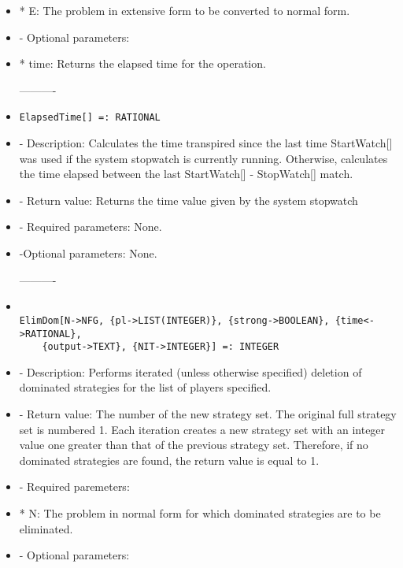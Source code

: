 \begin{itemize}
\bd
\item
*  E:  The problem in extensive form to be converted to normal form.
\ed

\item
- Optional parameters:
	
\bd
\item
*  time:  Returns the elapsed time for the operation.
\ed
\ed

----------

\item
\begin{verbatim}
ElapsedTime[] =: RATIONAL
\end{verbatim}

\bd
\item
- Description:  Calculates the time transpired since the last time
StartWatch[] was used if the system stopwatch is currently running.
Otherwise, calculates the time elapsed between the last StartWatch[] -
StopWatch[] match.
\item
- Return value:  Returns the time value given by the system stopwatch
\item
- Required parameters:  None.
\item   
-Optional parameters:  None.
\ed

----------
\item
\begin{verbatim}

ElimDom[N->NFG, {pl->LIST(INTEGER)}, {strong->BOOLEAN}, {time<->RATIONAL},
	{output->TEXT}, {NIT->INTEGER}] =: INTEGER
\end{verbatim}

\bd
\item
- Description:  Performs iterated (unless otherwise specified) deletion 
of dominated strategies for the list of players specified.  
\item  
- Return value:  The number of the new strategy set.  The original full
strategy set is numbered 1.  Each iteration creates a new strategy set
with an integer value one greater than that of the previous strategy 
set.  Therefore, if no dominated strategies are found, the return value
is equal to 1.
\item
- Required paremeters:
	
\bd
\item
*  N:  The problem in normal form for which dominated strategies are
to be eliminated.
\ed

\item
- Optional parameters:


\end{itemize}
